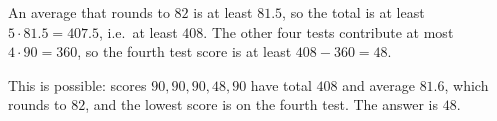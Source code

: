 An average that rounds to $82$ is at least $81.5$, so the total is at least $5\cdot81.5=407.5$, i.e.\ at least $408$. The other four tests contribute at most $4\cdot90=360$, so the fourth test score is at least $408-360=48$.

This is possible: scores $90,90,90,48,90$ have total $408$ and average $81.6$, which rounds to $82$, and the lowest score is on the fourth test. The answer is $\boxed{48}$.
